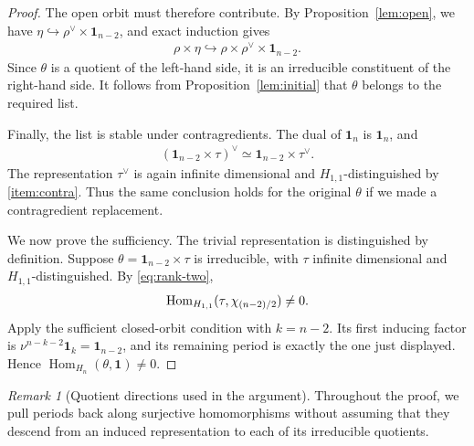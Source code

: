 \documentclass[11pt,leqno]{amsart}
\numberwithin{equation}{section}
\theoremstyle{plain}
\theoremstyle{definition}
\theoremstyle{remark}
\newtheorem{remark}[theorem]{Remark}
\DeclareMathOperator{\Hom}{Hom}
\newcommand{\one}{\mathbf{1}}
\newcommand{\into}{\hookrightarrow}
\begin{document}
\begin{proof}
		The open orbit must therefore contribute.
		By	Proposition~\ref{lem:open}, we have $\eta\into\rho^\vee\times\one_{n-2}$, and exact induction gives
		\begin{align*}
			\rho\times\eta\into \rho\times\rho^\vee\times\one_{n-2}.
		\end{align*}
		Since $\theta$ is a quotient of the left-hand side, it is an irreducible constituent of the right-hand side.
		It follows from Proposition~\ref{lem:initial} that $\theta$
		belongs to the required list.
		
		Finally, the list is stable under contragredients.
		The dual of $\one_n$ is $\one_n$, and
		\begin{align*}
			(\one_{n-2}\times\tau)^\vee \simeq\one_{n-2}\times\tau^\vee.
		\end{align*}
		The representation $\tau^\vee$ is again infinite dimensional and $H_{1,1}$-distinguished by \ref{item:contra}.
		Thus the same conclusion holds for the original $\theta$ if we made a contragredient replacement.
		
		We now prove the sufficiency. 
		The trivial representation is distinguished by definition. 
		Suppose $\theta=\one_{n-2}\times\tau$ is irreducible, with $\tau$ infinite dimensional and $H_{1,1}$-distinguished.
		By \eqref{eq:rank-two},
		\begin{align*}
			{\rm Hom}_{H_{1,1}}(\tau,\chi_{(n-2)/2})\ne0.
		\end{align*}
		Apply the sufficient closed-orbit condition \cite[Lemma 2.9(1)]{DSV} with $k=n-2$.
		Its first inducing factor is $\nu^{n-k-2}\one_k=\one_{n-2}$, and its remaining period is
		exactly the one just displayed.
		Hence $\Hom_{H_n}(\theta,\one)\ne0$.
	\end{proof}
	
	
	
	\begin{remark}[Quotient directions used in the argument]
		Throughout the proof, we pull periods back along surjective
		homomorphisms without assuming that they descend from an induced
		representation to each of its irreducible quotients.
	\end{remark}
	
\end{document}
